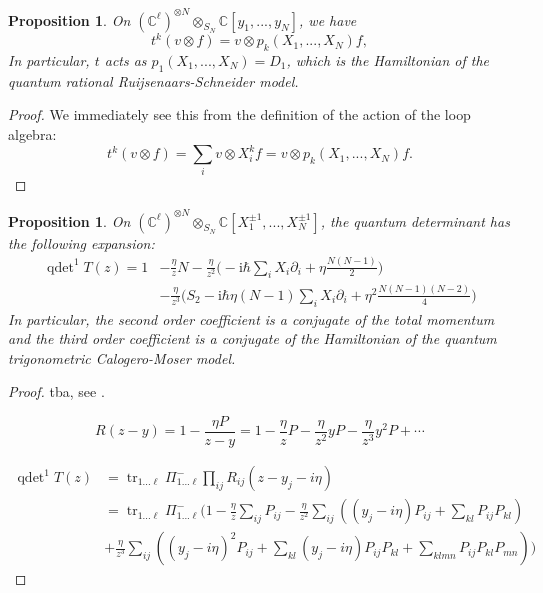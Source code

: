 \documentclass[11pt]{report}
\newtheorem{prop}[theorem]{Proposition}
\theoremstyle{definition}
\theoremstyle{remark}
\theoremstyle{remark}
\newcommand{\C}{\mathbb{C}}
\newcommand{\I}{\mathrm{i}}
\begin{document}
\begin{prop}
On $(\C^\ell)^{\otimes N} \otimes_{S_N} \C[y_1,...,y_N]$, we have
\begin{equation*}
t^k(v \otimes f) = v \otimes p_k(X_1,...,X_N) f,
\end{equation*}
In particular, $t$ acts as $p_1(X_1,...,X_N) = D_1$, which is the Hamiltonian of the quantum rational Ruijsenaars-Schneider model.
\end{prop}

\begin{proof}
We immediately see this from the definition of the action of the loop algebra:
\begin{equation*}
t^k(v \otimes f) = \sum_i v \otimes X_i^k f = v \otimes p_k(X_1,...,X_N) f.
\end{equation*}
\end{proof}

\begin{prop}
On $(\C^\ell)^{\otimes N} \otimes_{S_N} \C[X_1^{\pm 1},...,X_N^{\pm 1}]$, the quantum determinant has the following expansion:
\begin{align*}
\operatorname{qdet}^1 T(z)
= 1 &- \frac{\eta}{z} N - \frac{\eta}{z^2} \bigg( -\I \hbar \sum_i X_i \partial_i + \eta \frac{N(N-1)}{2} \bigg) \\
&- \frac{\eta}{z^3} \bigg( S_2 - \I \hbar \eta (N-1) \sum_i X_i \partial_i + \eta^2 \frac{N(N-1)(N-2)}{4} \bigg)
\end{align*}
In particular, the second order coefficient is a conjugate of the total momentum and the third order coefficient is a conjugate of the Hamiltonian of the quantum trigonometric Calogero-Moser model.
\end{prop}

\begin{proof}
tba, see \cite{article:bernard:1993}.

\begin{equation*}
R(z-y) = 1 - \frac{\eta P}{z-y} = 1 - \frac{\eta}{z} P - \frac{\eta}{z^2} y P - \frac{\eta}{z^3} y^2 P + \cdots
\end{equation*}

\begin{align*}
\operatorname{qdet}^1 T(z)
&= \operatorname{tr}_{1...\ell} \Pi_{1...\ell}^- \prod_{ij} R_{ij}(z-y_j-i\eta) \\
&= \operatorname{tr}_{1...\ell} \Pi_{1...\ell}^- ( 1
- \frac{\eta}{z} \sum_{ij} P_{ij}
- \frac{\eta}{z^2} \sum_{ij} \left( (y_j-i\eta) P_{ij} + \sum_{kl} P_{ij} P_{kl} \right) \\
&+ \frac{\eta}{z^3} \sum_{ij} \left( (y_j-i\eta)^2 P_{ij} + \sum_{kl} (y_j-i\eta) P_{ij} P_{kl} + \sum_{klmn} P_{ij} P_{kl} P_{mn} \right) )
\end{align*}
\end{proof}
\end{document}
